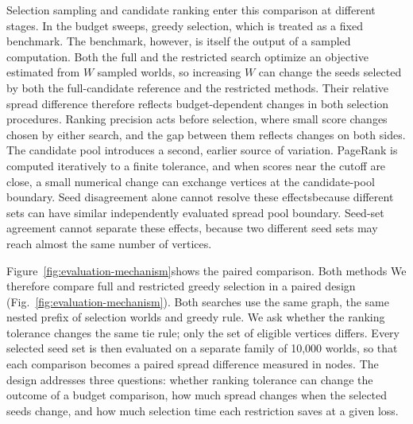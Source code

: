 \documentclass[smallextended]{svjour3}
\providecommand{\DIFaddtex}[1]{{\protect\color{blue} \sf #1}} %
\providecommand{\DIFdeltex}[1]{{\protect\color{red} \scriptsize #1}} %
\providecommand{\DIFaddbegin}{} %
\providecommand{\DIFaddend}{} %
\providecommand{\DIFdelbegin}{} %
\providecommand{\DIFdelend}{} %
\providecommand{\DIFadd}[1]{\texorpdfstring{\DIFaddtex{#1}}{#1}} %
\providecommand{\DIFdel}[1]{\texorpdfstring{\DIFdeltex{#1}}{}} %
\providecommand{\DIFscaledelfig}{0.5}
\newlength{\DIFdelgraphicswidth} %
\newlength{\DIFdelgraphicsheight} %
\providecommand{\DIFaddincludegraphics}[2][]{{\color{blue}\fbox{\DIFOincludegraphics[#1]{#2}}}} %
\providecommand{\DIFdelincludegraphics}[2][]{%
\sbox{\DIFdelgraphicsbox}{\DIFOincludegraphics[#1]{#2}}%
\settoboxwidth{\DIFdelgraphicswidth}{\DIFdelgraphicsbox} %
\settoboxtotalheight{\DIFdelgraphicsheight}{\DIFdelgraphicsbox} %
\scalebox{\DIFscaledelfig}{%
\parbox[b]{\DIFdelgraphicswidth}{\usebox{\DIFdelgraphicsbox}\\[-\baselineskip] \rule{\DIFdelgraphicswidth}{0em}}\llap{\resizebox{\DIFdelgraphicswidth}{\DIFdelgraphicsheight}{%
\setlength{\unitlength}{\DIFdelgraphicswidth}%
\begin{picture}(1,1)%
\thicklines\linethickness{2pt} %
{\color[rgb]{1,0,0}\put(0,0){\framebox(1,1){}}}%
{\color[rgb]{1,0,0}\put(0,0){\line( 1,1){1}}}%
{\color[rgb]{1,0,0}\put(0,1){\line(1,-1){1}}}%
\end{picture}%
}\hspace*{3pt}}} %
} %
\DeclareRobustCommand{\DIFaddbegin}{\DIFOaddbegin \let\includegraphics\DIFaddincludegraphics} %
\DeclareRobustCommand{\DIFaddend}{\DIFOaddend \let\includegraphics\DIFOincludegraphics} %
\DeclareRobustCommand{\DIFdelbegin}{\DIFOdelbegin \let\includegraphics\DIFdelincludegraphics} %
\DeclareRobustCommand{\DIFdelend}{\DIFOaddend \let\includegraphics\DIFOincludegraphics} %
\begin{document}
\DIFdel{Selection sampling and candidate ranking enter this comparison at different stages. In the budget sweeps, }\DIFdelend \DIFaddbegin \DIFadd{greedy selection, which is treated as a fixed benchmark. The benchmark, however, is itself the output of a sampled computation. Both the full and the restricted search optimize an objective estimated from $W$ sampled worlds, so }\DIFaddend increasing $W$ can change the seeds \DIFdelbegin \DIFdel{selected by both the full-candidate reference and the restricted methods. Their relative spread difference therefore reflects budget-dependent changes in both selection procedures. Ranking precision acts before selection, where small score changes }\DIFdelend \DIFaddbegin \DIFadd{chosen by either search, and the gap between them reflects changes on both sides. The candidate pool introduces a second, earlier source of variation. PageRank is computed iteratively to a finite tolerance, and when scores near the cutoff are close, a small numerical change }\DIFaddend can exchange vertices at the \DIFdelbegin \DIFdel{candidate-pool boundary. Seed disagreement alone cannot resolve these effectsbecause different sets can have similar independently evaluated spread}\DIFdelend \DIFaddbegin \DIFadd{pool boundary. Seed-set agreement cannot separate these effects, because two different seed sets may reach almost the same number of vertices}\DIFaddend .

\DIFdelbegin \DIFdel{Figure~\ref{fig:evaluation-mechanism}shows the paired comparison. Both methods }\DIFdelend \DIFaddbegin \DIFadd{We therefore compare full and restricted greedy selection in a paired design (Fig.~\ref{fig:evaluation-mechanism}). Both searches }\DIFaddend use the same graph, \DIFaddbegin \DIFadd{the same nested prefix of }\DIFaddend selection worlds and \DIFdelbegin \DIFdel{greedy rule. We ask whether the ranking tolerance changes }\DIFdelend \DIFaddbegin \DIFadd{the same tie rule; only the set of eligible vertices differs. Every selected seed set is then evaluated on a separate family of 10,000 worlds, so that each comparison becomes a paired spread difference measured in nodes. The design addresses three questions: whether ranking tolerance can change }\DIFaddend the outcome of a budget comparison, how much spread changes when the \DIFaddbegin \DIFadd{selected }\DIFaddend seeds change, and how much selection time each restriction saves \DIFaddbegin \DIFadd{at a given loss}\DIFaddend .
\end{document}
